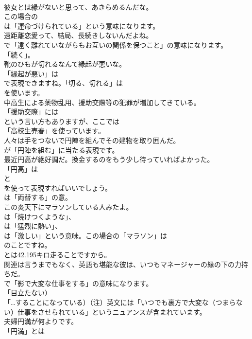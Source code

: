 \documentclass[8pt]{extreport}
\begin{document}
\begin{CJK}{UTF8}{min}
\\	彼女とは縁がないと思って、あきらめるんだな。 
\\	この場合の
\\	は「運命づけられている」という意味になります。	
\\	遠距離恋愛って、結局、長続きしないんだよね。 
\\	で「遠く離れていながらもお互いの関係を保つこと」の意味になります。
\\	「続く」。	
\\	靴のひもが切れるなんて縁起が悪いな。 
\\	「縁起が悪い」は
\\	で表現できますね。「切る、切れる」は
\\	を使います。	
\\	中高生による薬物乱用、援助交際等の犯罪が増加してきている。 
\\	「援助交際」には
\\	という言い方もありますが、ここでは
\\	「高校生売春」を使っています。	
\\	人々は手をつないで円陣を組んでその建物を取り囲んだ。 
\\	が「円陣を組む」に当たる表現です。	
\\	最近円高が絶好調だ。換金するのをもう少し待っていればよかった。 
\\	「円高」は 
\\	と 
\\	を使って表現すればいいでしょう。
\\	は「両替する」の意。	
\\	この炎天下にマラソンしている人みたよ。 
\\	は「焼けつくような」、
\\	は「猛烈に熱い」、
\\	は「激しい」という意味。この場合の「マラソン」は
\\	のことですね。
\\	とは42.195キロ走ることですから。	
\\	関連は言うまでもなく、英語も堪能な彼は、いつもマネージャーの縁の下の力持ちだ。 
\\	で「影で大変な仕事をする」の意味になります。
\\	「目立たない）
\\	「…することになっている）（注）英文には「いつでも裏方で大変な（つまらない）仕事をさせられている」というニュアンスが含まれています。	
\\	夫婦円満が何よりです。 
\\	「円満」とは

\end{CJK}
\end{document}
